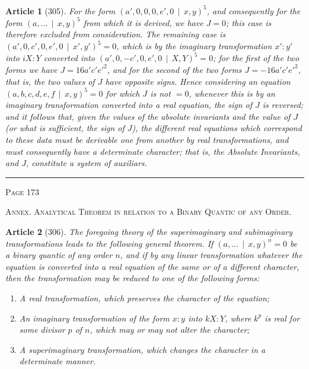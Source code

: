 \documentclass[11pt,a4paper]{article}
\theoremstyle{cayley}
\newtheorem{art}{Article}
\begin{document}
\begin{art}[305]
For the form $(a', 0, 0, 0, e', 0 \,\mid\, x, y)^5$, and consequently for the form $(a, \ldots \,\mid\, x, y)^5$ from which it is derived, we have $J=0$; this case is therefore excluded from consideration. The remaining case is $(a', 0, c', 0, e', 0 \,\mid\, x', y')^5 = 0$, which is by the imaginary transformation $x':y'$ into $iX:Y$ converted into $(a', 0, -c', 0, e', 0 \,\mid\, X, Y)^5 = 0$; for the first of the two forms we have $J = 16a'c'e'^2$, and for the second of the two forms $J = -16a'c'e'^2$, that is, the two values of $J$ have opposite signs. Hence considering an equation $(a, b, c, d, e, f \,\mid\, x, y)^5 = 0$ for which $J$ is not $=0$, whenever this is by an imaginary transformation converted into a real equation, the sign of $J$ is reversed; and it follows that, given the values of the absolute invariants and the value of $J$ (or what is sufficient, the sign of $J$), the different real equations which correspond to these data must be derivable one from another by real transformations, and must consequently have a determinate character; that is, the Absolute Invariants, and $J$, constitute a system of auxiliars.
\end{art}

\vspace{1em}
\noindent\rule{\textwidth}{0.4pt}
\begin{center}\textsc{Page 173}\end{center}
\newpage

\begin{center}
\textsc{Annex. Analytical Theorem in relation to a Binary Quantic of any Order.}
\end{center}

\begin{art}[306]
The foregoing theory of the superimaginary and subimaginary transformations leads to the following general theorem. If $(a, \ldots \,\mid\, x, y)^n = 0$ be a binary quantic of any order $n$, and if by any linear transformation whatever the equation is converted into a real equation of the same or of a different character, then the transformation may be reduced to one of the following forms:
\begin{enumerate}[label=\arabic*.,itemsep=2pt]
\item A real transformation, which preserves the character of the equation;
\item An imaginary transformation of the form $x:y$ into $kX:Y$, where $k^p$ is real for some divisor $p$ of $n$, which may or may not alter the character;
\item A superimaginary transformation, which changes the character in a determinate manner.
\end{enumerate}
\end{art}
\end{document}
